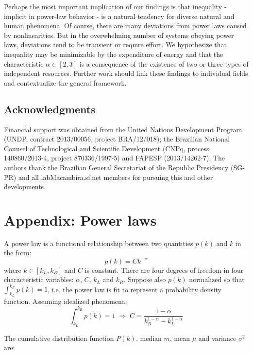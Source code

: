 \documentclass[10pt,letterpaper]{article}
\begin{document}
Perhaps the most important implication of our findings is that inequality - implicit in power-law behavior - is a natural tendency for diverse natural and human phenomena. Of course, there are many deviations from power laws caused by nonlinearities. But in the overwhelming number of systems obeying power laws, deviations tend to be transient or require effort. We hypothesize that inequality may be minimizable by the expenditure of energy and that the characteristic $\alpha \in [2,3]$ is a consequence of the existence of two or three types of independent resources. Further work should link these findings to individual fields and contextualize the general framework.

\subsection*{Acknowledgments}
Financial support was obtained from the United Nations Development Program (UNDP, contract 2013/00056, project BRA/12/018);
the Brazilian National Counsel of Technological and Scientific Development (CNPq, process 140860/2013-4, project 870336/1997-5) and FAPESP (2013/14262-7).
The authors thank the Brazilian General Secretariat of the Republic Presidency (SG-PR) and all labMacambira.sf.net members for pursuing this and other developments.

\section*{Appendix: Power laws}
\renewcommand\theequation{A\arabic{equation}}
\setcounter{equation}{0}
A power law is a functional relationship between two quantities $p(k)$ and $k$ in the form:
\begin{equation}\label{eq:pow}
p(k) = Ck^{-\alpha}
\end{equation}
\noindent where $k\in [k_L,k_R]$
and $C$ is constant.
There are four degrees of freedom in four characteristic variables:
$\alpha$, $C$, $k_L$ and $k_R$.
Suppose also $p(k)$ normalized so that
$\int_{k_L}^{k_R}p(k)=1$, i.e.
the power law is fit to represent a
probability density function.
Assuming idealized phenomena:
\begin{equation}\label{eq:con}
\int_{k_L}^{k_R}p(k)=1\;\Rightarrow\;
C=\frac{1-\alpha}{k_R^{1-\alpha}-k_L^{1-\alpha}}
\end{equation}

The cumulative distribution function $P(k)$, median $m$, mean $\mu$ and variance $\sigma^2$ are:
\end{document}
